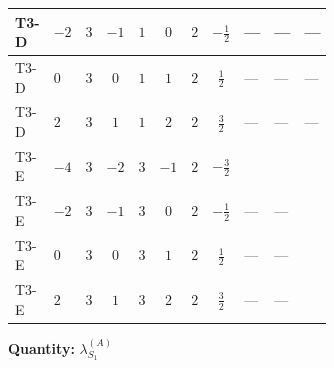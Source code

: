 \documentclass[8pt]{article}
\begin{document}
\begin{landscape}
\begin{longtable}{@{}llcccccc >{\raggedright\arraybackslash}p{0.21\linewidth} >{\raggedright\arraybackslash}p{0.21\linewidth} >{\raggedright\arraybackslash}p{0.21\linewidth}@{}}
\midrule
T3-D & $-2$ & $3$ & $-1$ & $1$ & $0$ & $2$ & $-\frac{1}{2}$ & --- & --- & --- \\
\midrule
T3-D & $0$ & $3$ & $0$ & $1$ & $1$ & $2$ & $\frac{1}{2}$ & --- & --- & --- \\
\midrule
T3-D & $2$ & $3$ & $1$ & $1$ & $2$ & $2$ & $\frac{3}{2}$ & --- & --- & --- \\
\midrule
T3-E & $-4$ & $3$ & $-2$ & $3$ & $-1$ & $2$ & $-\frac{3}{2}$ & \scriptsize\adjustbox{max width=\linewidth}{$\begin{gathered} +{g_1}^2 \left(36 {g_2}^2-6 {\lambda_{S_1}^{(1)}}-48 {\lambda_{S_1}^{(A)}}\right)\end{gathered}$} & \scriptsize\adjustbox{max width=\linewidth}{$\begin{gathered} +24 {g_1}^4\end{gathered}$} & \scriptsize\adjustbox{max width=\linewidth}{$\begin{gathered} +\frac{3 {\lambda_{12}^{(1)}}^2}{4}\end{gathered}$} \\
\midrule
T3-E & $-2$ & $3$ & $-1$ & $3$ & $0$ & $2$ & $-\frac{1}{2}$ & --- & --- & \scriptsize\adjustbox{max width=\linewidth}{$\begin{gathered} +\frac{3 {\lambda_{12}^{(1)}}^2}{4}\end{gathered}$} \\
\midrule
T3-E & $0$ & $3$ & $0$ & $3$ & $1$ & $2$ & $\frac{1}{2}$ & --- & --- & \scriptsize\adjustbox{max width=\linewidth}{$\begin{gathered} +\frac{3 {\lambda_{12}^{(1)}}^2}{4}\end{gathered}$} \\
\midrule
T3-E & $2$ & $3$ & $1$ & $3$ & $2$ & $2$ & $\frac{3}{2}$ & --- & --- & \scriptsize\adjustbox{max width=\linewidth}{$\begin{gathered} +\frac{3 {\lambda_{12}^{(1)}}^2}{4}\end{gathered}$} \\
\midrule
\bottomrule
\end{longtable}
\clearpage
\noindent\textbf{Quantity: }$\lambda_{S_1}^{(A)}$\par\smallskip

\end{landscape}
\end{document}

